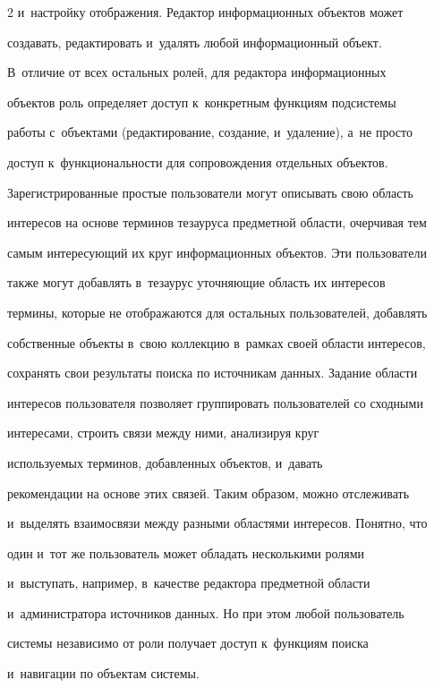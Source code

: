 \begin{multicols}{2}
и~настройку отображения. Редак\-тор информационных объектов может 

создавать, редактировать и~удалять любой информационный объект. 

В~отличие от всех остальных ролей, для редактора информационных 

объектов роль определяет доступ к~конкретным функциям подсистемы 

рабо\-ты с~объектами (редактирование, создание, и~удаление), а~не просто 

доступ к~функциональ\-ности для сопровождения отдельных объектов. 

Зарегистрированные простые пользователи могут описывать свою об\-ласть 

интересов на основе терминов тезауруса предметной об\-ласти, очерчивая тем 

самым интересующий их круг информационных объектов. Эти пользователи 

также могут добавлять в~тезаурус уточняющие об\-ласть их интересов 

термины, которые не отображаются для остальных пользователей, добавлять 

собственные объекты в~свою коллекцию в~рамках своей об\-ласти интересов, 

сохранять свои результаты поиска по источникам данных. Задание об\-ласти 

интересов пользователя позволяет группировать пользователей со сходными 

интересами, строить связи между ними, анализируя круг 

используемых терминов, добавленных объектов, и~давать 

рекомендации на основе этих связей. Таким образом, можно отслеживать 

и~выделять взаимосвязи между разными об\-лас\-тя\-ми интересов. Понятно, что 

один и~тот же пользователь может обладать несколькими ролями 

и~выступать, например, в~качестве редактора предметной об\-ласти 

и~администратора источников данных. Но при этом любой пользователь 

системы независимо от роли получает доступ к~функциям поиска 

и~навигации по объектам системы.

    

\begin{figure} %


\end{figure}
\end{multicols}
